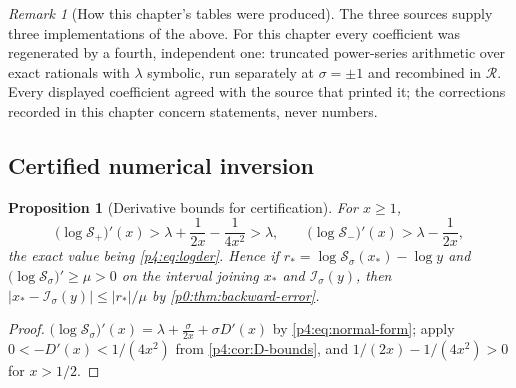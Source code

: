 \documentclass[11pt,a4paper,oneside]{book}
\theoremstyle{plain}
\newtheorem{proposition}[theorem]{Proposition}
\theoremstyle{definition}
\theoremstyle{remark}
\newtheorem{remark}[theorem]{Remark}
\begin{document}
\begin{remark}[How this chapter's tables were produced]
\label{p4:rem:how-computed}
The three sources supply three implementations of the above.  For this chapter
every coefficient was regenerated by a fourth, independent one: truncated
power-series arithmetic over exact rationals with $\lambda$ symbolic, run
separately at $\sigma=\pm1$ and recombined in $\mathscr R$.  Every displayed
coefficient agreed with the source that printed it; the corrections recorded
in this chapter concern statements, never numbers.
\end{remark}

\subsection{Certified numerical inversion}

\begin{proposition}[Derivative bounds for certification]
\label{p4:prop:derivative-bounds}
For $x\ge1$,
\begin{equation}
  \bigl(\log\mathcal S_+\bigr)'(x)>\lambda+\frac1{2x}-\frac1{4x^{2}}>\lambda,
  \qquad
  \bigl(\log\mathcal S_-\bigr)'(x)>\lambda-\frac1{2x},
  \label{p4:eq:derivative-bounds}
\end{equation}
the exact value being \cref{p4:eq:logder}.  Hence if
$r_*=\log\mathcal S_\sigma(x_*)-\log y$ and
$\bigl(\log\mathcal S_\sigma\bigr)'\ge\mu>0$ on the interval joining $x_*$ and
$\mathcal I_\sigma(y)$, then
$|x_*-\mathcal I_\sigma(y)|\le|r_*|/\mu$ by \cref{p0:thm:backward-error}.
\end{proposition}

\begin{proof}
$\bigl(\log\mathcal S_\sigma\bigr)'(x)=\lambda+\tfrac\sigma{2x}+\sigma D'(x)$
by \cref{p4:eq:normal-form}; apply $0<-D'(x)<1/(4x^{2})$ from
\cref{p4:cor:D-bounds}, and $1/(2x)-1/(4x^{2})>0$ for $x>1/2$.
\end{proof}
\end{document}
